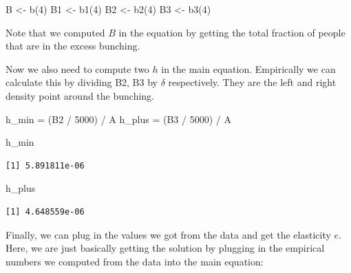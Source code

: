 \documentclass[
  letterpaper,
  DIV=11,
  numbers=noendperiod]{scrartcl}
\newenvironment{Shaded}{\begin{snugshade}}{\end{snugshade}}
\newcommand{\DecValTok}[1]{\textcolor[rgb]{0.68,0.00,0.00}{#1}}
\newcommand{\FunctionTok}[1]{\textcolor[rgb]{0.28,0.35,0.67}{#1}}
\newcommand{\NormalTok}[1]{\textcolor[rgb]{0.00,0.23,0.31}{#1}}
\newcommand{\OtherTok}[1]{\textcolor[rgb]{0.00,0.23,0.31}{#1}}
\newcommand{\SpecialCharTok}[1]{\textcolor[rgb]{0.37,0.37,0.37}{#1}}
\begin{document}
\begin{Shaded}
\begin{Highlighting}[]
\NormalTok{B }\OtherTok{\textless{}{-}} \FunctionTok{b}\NormalTok{(}\DecValTok{4}\NormalTok{)}
\NormalTok{B1 }\OtherTok{\textless{}{-}} \FunctionTok{b1}\NormalTok{(}\DecValTok{4}\NormalTok{)}
\NormalTok{B2 }\OtherTok{\textless{}{-}} \FunctionTok{b2}\NormalTok{(}\DecValTok{4}\NormalTok{)}
\NormalTok{B3 }\OtherTok{\textless{}{-}} \FunctionTok{b3}\NormalTok{(}\DecValTok{4}\NormalTok{)}
\end{Highlighting}
\end{Shaded}

Note that we computed \(B\) in the equation by getting the total
fraction of people that are in the excess bunching.

Now we also need to compute two \(h\) in the main equation. Empirically
we can calculate this by dividing B2, B3 by \(\delta\) respectively.
They are the left and right density point around the bunching.

\begin{Shaded}
\begin{Highlighting}[]
\NormalTok{h\_min }\OtherTok{=}\NormalTok{ (B2 }\SpecialCharTok{/} \DecValTok{5000}\NormalTok{) }\SpecialCharTok{/}\NormalTok{ A}
\NormalTok{h\_plus }\OtherTok{=}\NormalTok{ (B3 }\SpecialCharTok{/} \DecValTok{5000}\NormalTok{) }\SpecialCharTok{/}\NormalTok{ A }

\NormalTok{h\_min}
\end{Highlighting}
\end{Shaded}

\begin{verbatim}
[1] 5.891811e-06
\end{verbatim}

\begin{Shaded}
\begin{Highlighting}[]
\NormalTok{h\_plus}
\end{Highlighting}
\end{Shaded}

\begin{verbatim}
[1] 4.648559e-06
\end{verbatim}

Finally, we can plug in the values we got from the data and get the
elasticity \(e\). Here, we are just basically getting the solution by
plugging in the empirical numbers we computed from the data into the
main equation:
\end{document}
